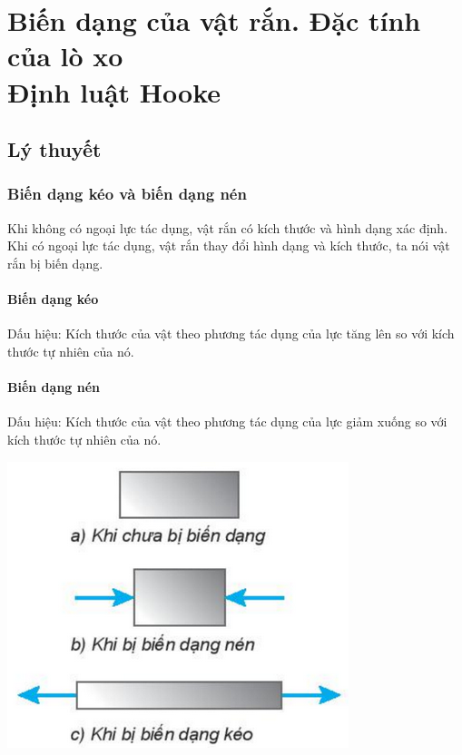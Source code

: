 \let\lesson\undefined
\newcommand{\lesson}{\phantomlesson{Bài 22 + 23: Biến dạng của vật rắn. Đặc tính của lò xo. Định luật Hooke}}
\chapter[Biến dạng của vật rắn. Đặc tính của lò xo\\ Định luật Hooke]{Biến dạng của vật rắn. Đặc tính của lò xo\\ Định luật Hooke}
\setcounter{section}{0}
\section{Lý thuyết}
\subsection{Biến dạng kéo và biến dạng nén}
Khi không có ngoại lực tác dụng, vật rắn có kích thước và hình dạng xác định. Khi có ngoại lực tác dụng, vật rắn thay đổi hình dạng và kích thước, ta nói vật rắn bị biến dạng.

\begin{minipage}{0.6\textwidth}
	\subsubsection{Biến dạng kéo}
	Dấu hiệu: Kích thước của vật theo phương tác dụng của lực tăng lên so với kích thước tự nhiên của nó.
	\subsubsection{Biến dạng nén}
	Dấu hiệu: Kích thước của vật theo phương tác dụng của lực giảm xuống so với kích thước tự nhiên của nó.
\end{minipage}
\begin{minipage}{0.4\textwidth}
	\begin{center}
		\includegraphics[scale=0.6]{../figs/G10-028-1}
	\end{center}
\end{minipage}

